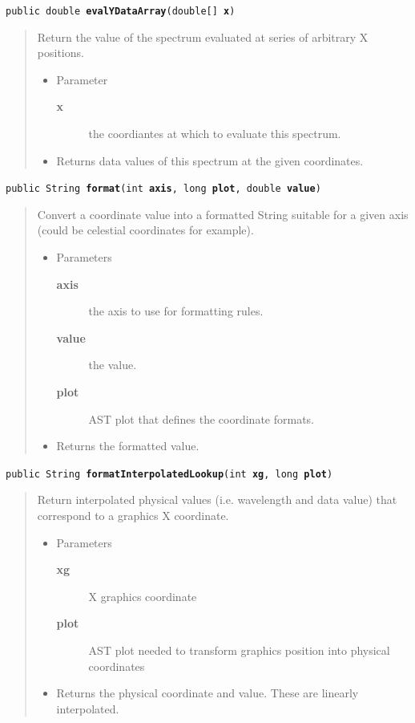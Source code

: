 \documentclass[twoside,11pt]{article}
\renewcommand{\_}{\texttt{\symbol{95}}}
\newcommand{\method}[1]{\texttt{#1}}
\newenvironment{desc}{\begin{quote}}{\end{quote}}
\begin{document}
\method{public double \textbf{evalYDataArray}(\texttt{double[]} \textbf{x})\label{l37}\label{l38}}
\begin{desc}Return the value of the spectrum evaluated at series of
 arbitrary X positions.
\begin{itemize}
\item{Parameter
  \begin{description}
   \item[\textbf{x}]{the coordiantes at which to evaluate this spectrum.}
  \end{description}}
\end{itemize}
\begin{itemize}
\item{Returns data values of this spectrum at the given coordinates. }
\end{itemize}
\end{desc}

\method{public String \textbf{format}(\texttt{int} \textbf{axis}, \texttt{long} \textbf{plot}, \texttt{double} \textbf{value})\label{l39}\label{l40}}
\begin{desc}Convert a coordinate value into a formatted String suitable for
 a given axis (could be celestial coordinates for example).
\begin{itemize}
\item{Parameters
  \begin{description}
   \item[\textbf{axis}]{the axis to use for formatting rules.}
   \item[\textbf{value}]{the value.}
   \item[\textbf{plot}]{AST plot that defines the coordinate formats.}
  \end{description}}
\end{itemize}
\begin{itemize}
\item{Returns the formatted value. }
\end{itemize}
\end{desc}

\method{public String \textbf{formatInterpolatedLookup}(\texttt{int} \textbf{xg}, \texttt{long} \textbf{plot})\label{l41}\label{l42}}
\begin{desc}Return interpolated physical values (i.e. wavelength and data
 value) that correspond to a graphics X coordinate.
\begin{itemize}
\item{Parameters
  \begin{description}
   \item[\textbf{xg}]{X graphics coordinate}
   \item[\textbf{plot}]{AST plot needed to transform graphics position
            into physical coordinates}
  \end{description}}
\end{itemize}
\begin{itemize}
\item{Returns the physical coordinate and value. These are
 linearly interpolated. }
\end{itemize}
\end{desc}
\end{document}
